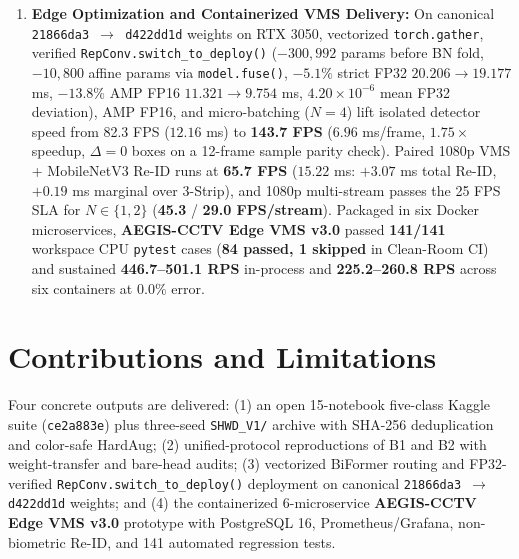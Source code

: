 \begin{enumerate}[leftmargin=1.8em, itemsep=3pt]
  \item \textbf{Edge Optimization and Containerized VMS Delivery:} On canonical \texttt{21866da3 $\to$ d422dd1d} weights on RTX 3050, vectorized \texttt{torch.gather}, verified \nolinkurl{RepConv.switch_to_deploy()} ($-300,992$ params before BN fold, $-10,800$ affine params via \texttt{model.fuse()}, $-5.1\%$ strict FP32 $20.206 \to 19.177$ ms, $-13.8\%$ AMP FP16 $11.321 \to 9.754$ ms, $4.20 \times 10^{-6}$ mean FP32 deviation), AMP FP16, and micro-batching ($N=4$) lift isolated detector speed from 82.3 FPS ($12.16$ ms) to \textbf{143.7 FPS} ($6.96$ ms/frame, $1.75\times$ speedup, $\Delta = 0$ boxes on a 12-frame sample parity check). Paired 1080p VMS + MobileNetV3 Re-ID runs at \textbf{65.7 FPS} ($15.22$ ms: $+3.07$ ms total Re-ID, $+0.19$ ms marginal over 3-Strip), and 1080p multi-stream passes the 25 FPS SLA for $N \in \{1, 2\}$ (\textbf{45.3} / \textbf{29.0 FPS/stream}). Packaged in six Docker microservices, \textbf{AEGIS-CCTV Edge VMS v3.0} passed \textbf{141/141} workspace CPU \texttt{pytest} cases (\textbf{84 passed, 1 skipped} in Clean-Room CI) and sustained \textbf{446.7--501.1 RPS} in-process and \textbf{225.2--260.8 RPS} across six containers at $0.0\%$ error.
\end{enumerate}

\section{Contributions and Limitations}

Four concrete outputs are delivered: (1) an open 15-notebook five-class Kaggle suite (\texttt{ce2a883e}) plus three-seed \texttt{SHWD\_V1/} archive with SHA-256 deduplication and color-safe HardAug; (2) unified-protocol reproductions of B1 and B2 with weight-transfer and bare-head audits; (3) vectorized BiFormer routing and FP32-verified \nolinkurl{RepConv.switch_to_deploy()} deployment on canonical \texttt{21866da3 $\to$ d422dd1d} weights; and (4) the containerized 6-microservice \textbf{AEGIS-CCTV Edge VMS v3.0} prototype with PostgreSQL 16, Prometheus/Grafana, non-biometric Re-ID, and 141 automated regression tests.

